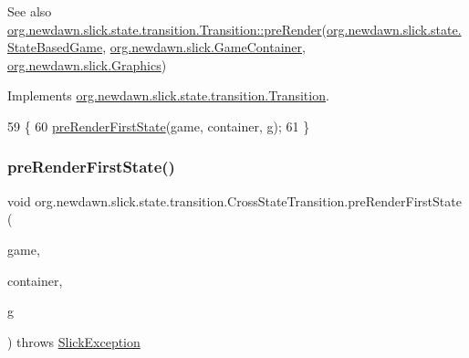 \begin{DoxySeeAlso}{See also}
\mbox{\hyperlink{interfaceorg_1_1newdawn_1_1slick_1_1state_1_1transition_1_1_transition_ab8b0668c059830d938575d1a0b08bd93}{org.\+newdawn.\+slick.\+state.\+transition.\+Transition\+::pre\+Render}}(\mbox{\hyperlink{classorg_1_1newdawn_1_1slick_1_1state_1_1_state_based_game}{org.\+newdawn.\+slick.\+state.\+State\+Based\+Game}}, \mbox{\hyperlink{classorg_1_1newdawn_1_1slick_1_1_game_container}{org.\+newdawn.\+slick.\+Game\+Container}}, \mbox{\hyperlink{classorg_1_1newdawn_1_1slick_1_1_graphics}{org.\+newdawn.\+slick.\+Graphics}}) 
\end{DoxySeeAlso}


Implements \mbox{\hyperlink{interfaceorg_1_1newdawn_1_1slick_1_1state_1_1transition_1_1_transition_ab8b0668c059830d938575d1a0b08bd93}{org.\+newdawn.\+slick.\+state.\+transition.\+Transition}}.


\begin{DoxyCode}
59                                                                                                           \{
60         \mbox{\hyperlink{classorg_1_1newdawn_1_1slick_1_1state_1_1transition_1_1_cross_state_transition_a2b0f6825775c51f909cdabda0feb8d73}{preRenderFirstState}}(game, container, g);
61     \}
\end{DoxyCode}
\mbox{\label{classorg_1_1newdawn_1_1slick_1_1state_1_1transition_1_1_cross_state_transition_a2b0f6825775c51f909cdabda0feb8d73}} 
\subsubsection{\texorpdfstring{pre\+Render\+First\+State()}{preRenderFirstState()}}
{\footnotesize\ttfamily void org.\+newdawn.\+slick.\+state.\+transition.\+Cross\+State\+Transition.\+pre\+Render\+First\+State (\begin{DoxyParamCaption}\item[{\mbox{\hyperlink{classorg_1_1newdawn_1_1slick_1_1state_1_1_state_based_game}{State\+Based\+Game}}}]{game,  }\item[{\mbox{\hyperlink{classorg_1_1newdawn_1_1slick_1_1_game_container}{Game\+Container}}}]{container,  }\item[{\mbox{\hyperlink{classorg_1_1newdawn_1_1slick_1_1_graphics}{Graphics}}}]{g }\end{DoxyParamCaption}) throws \mbox{\hyperlink{classorg_1_1newdawn_1_1slick_1_1_slick_exception}{Slick\+Exception}}\hspace{0.3cm}{\ttfamily [inline]}}

